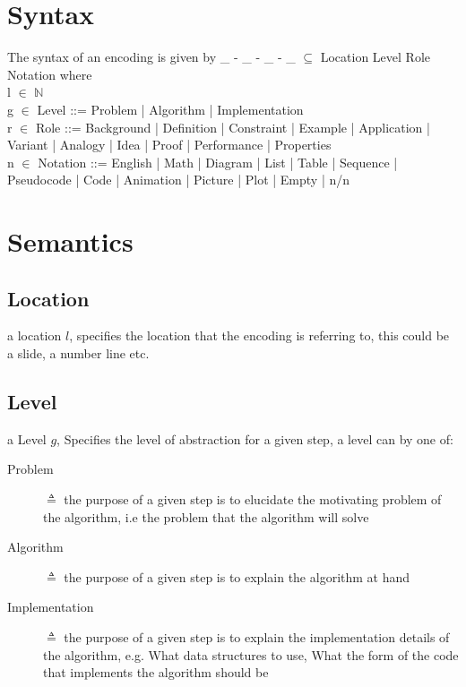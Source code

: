\documentclass[10pt, letterpaper]{article}
\begin{document}
\section*{Syntax}
\label{sec:org74ac92a}
The syntax of an encoding is given by \_ - \_ - \_ - \_ \(\subseteq\) Location \texttimes{} Level \texttimes{} Role \texttimes{} Notation where \\

l \(\in\) \(\mathbb{N}\) \\

g \(\in\) Level ::= Problem | Algorithm | Implementation \\

r \(\in\) Role ::= Background | Definition | Constraint | Example | Application | Variant | Analogy | Idea | Proof | Performance | Properties \\

n \(\in\) Notation ::= English | Math | Diagram | List | Table | Sequence | Pseudocode | Code | Animation | Picture | Plot | Empty | n/n \\

\section*{Semantics}
\label{sec:org96cc204}
\subsection*{Location}
\label{sec:org0f2d149}
a location \(l\), specifies the location that the encoding is referring to,
this could be a slide, a number line etc.
\subsection*{Level}
\label{sec:org0b85806}
a Level \(g\), Specifies the level of abstraction for a given step, a level can by one of:
\begin{description}
\item[{Problem}] \(\triangleq\) the purpose of a given step is to elucidate the
motivating problem of the algorithm, i.e the problem that the algorithm
will solve
\item[{Algorithm}] \(\triangleq\) the purpose of a given step is to explain the
algorithm at hand
\item[{Implementation}] \(\triangleq\) the purpose of a given step is to explain the
implementation details of the algorithm, e.g. What data structures to
use, What the form of the code that implements the algorithm should be
\end{description}
\end{document}

